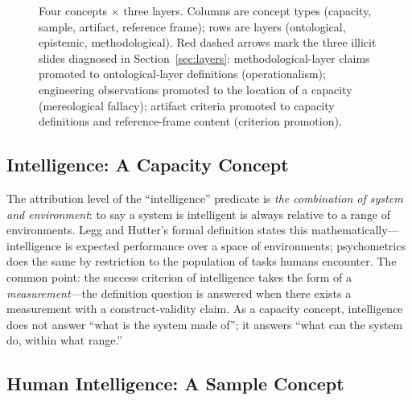 \documentclass[10pt]{article}
\begin{document}
\begin{figure}[t]
\caption{Four concepts $\times$ three layers. Columns are concept types (capacity, sample, artifact, reference frame); rows are layers (ontological, epistemic, methodological). Red dashed arrows mark the three illicit slides diagnosed in Section~\ref{sec:layers}: methodological-layer claims promoted to ontological-layer definitions (operationalism); engineering observations promoted to the location of a capacity (mereological fallacy); artifact criteria promoted to capacity definitions and reference-frame content (criterion promotion).}
\label{fig:matrix}
\end{figure}

\subsection{Intelligence: A Capacity Concept}

The attribution level of the ``intelligence'' predicate is \emph{the combination of system and environment}: to say a system is intelligent is always relative to a range of environments. Legg and Hutter's formal definition states this mathematically---intelligence is expected performance over a space of environments\cite{legg2007universal}; psychometrics does the same by restriction to the population of tasks humans encounter. The common point: the success criterion of intelligence takes the form of a \emph{measurement}---the definition question is answered when there exists a measurement with a construct-validity claim. As a capacity concept, intelligence does not answer ``what is the system made of''; it answers ``what can the system do, within what range.''

\subsection{Human Intelligence: A Sample Concept}
\end{document}
